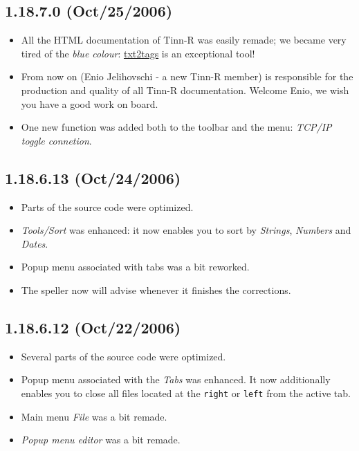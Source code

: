 \subsection*{1.18.7.0 (Oct/25/2006)}
\begin{itemize}
  \item All the HTML documentation of Tinn-R was easily remade; we became
    very tired of the \textit{blue colour}:
    \href{http://txt2tags.sourceforge.net/}{txt2tags}
    is an exceptional tool!
  \item From now on (Enio Jelihovschi - a new Tinn-R member) is 
    responsible for the production and quality of all Tinn-R documentation.
    Welcome Enio, we wish you have a good work on board.
  \item One new function was added both to the \RR{} toolbar and the \RR{}
    menu: \textit{TCP/IP toggle connetion}.
\end{itemize}


\subsection*{1.18.6.13 (Oct/24/2006)}
\begin{itemize}
  \item Parts of the source code were optimized.
  \item \textit{Tools/Sort} was enhanced: it now enables you to sort by
    \textit{Strings}, \textit{Numbers} and \textit{Dates}.
  \item Popup menu associated with tabs was a bit reworked.
  \item The speller now will advise whenever it finishes the
    corrections.
\end{itemize}


\subsection*{1.18.6.12 (Oct/22/2006)}
\begin{itemize}
  \item Several parts of the source code were optimized.
  \item Popup menu associated with the \textit{Tabs} was enhanced. It now
    additionally enables you to close all files located at the \texttt{right}
    or \texttt{left} from the active tab.
  \item Main menu \textit{File} was a bit remade.
  \item \textit{Popup menu editor} was a bit remade.
\end{itemize}


